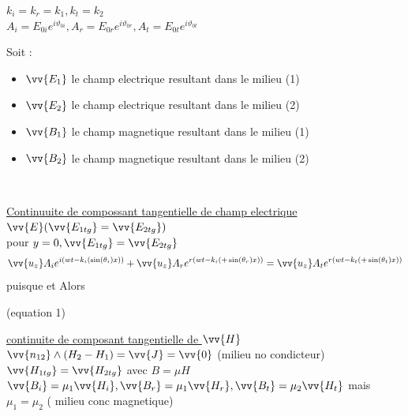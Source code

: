\documentclass[12pt]{book}
\begin{document}
                \begin{center}
                    $k_i =k_r =k_1 , k_t =k_2$ \\
                    $A_i = E_{0i}e^{i\vartheta_{0i}} , A_r = E_{0r}e^{i\vartheta_{0r}} , A_t = E_{0t}e^{i\vartheta_{0t}}$
                \end{center}
                \pagebreak
                Soit :
                \begin{itemize}
                    \item $\vv{E_1}$ le champ electrique resultant dans le milieu (1)
                    \item $\vv{E_2}$ le champ electrique resultant dans le milieu (2)
                    \item $\vv{B_1}$ le champ magnetique resultant dans le milieu (1)
                    \item $\vv{B_2}$ le champ magnetique resultant dans le milieu (2)
                \end{itemize}
                \begin{center}
                     \\
                \end{center}
                \underline{Continuuite de compossant tangentielle de champ electrique $\vv{E} (\vv{E_{1tg}}=\vv{E_{2tg}})$}
                    \\ pour $y=0 , \vv{E_{1tg}}=\vv{E_{2tg}} $
                    \[\vv{u_z}A_ie^{i(wt-k_i(\sin(\theta_i)x))} + \vv{u_z}A_re^{r(wt-k_i(+\sin(\theta_r)x))}  =\vv{u_z}A_te^{r(wt-k_t(+\sin(\theta_t)x))} \]
                    puisque  et  Alors
                \begin{center}
                     (equation 1)
                \end{center}
                \underline{continuite de composant tangentielle de $\vv{H}$} \\
                    $\vv{n_{12}}\wedge(H_2 - H_1) = \vv{J} = \vv{0}$ (milieu no condicteur) \\
                    $\vv{H_{1tg}}=\vv{H_{2tg}}$ avec $B= \mu H$ \\
                    $\vv{B_i} = \mu_1 \vv{H_i} , \vv{B_r} = \mu_1 \vv{H_r} , \vv{B_t} = \mu_2 \vv{H_t}$
                    mais $\mu_1 =\mu_2$ ( milieu conc magnetique)\\
\end{document}
